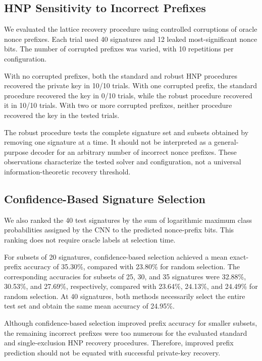 \documentclass[11pt,a4paper]{article}
\begin{document}
\subsection{HNP Sensitivity to Incorrect Prefixes}

We evaluated the lattice recovery procedure using controlled
corruptions of oracle nonce prefixes. Each trial used 40
signatures and 12 leaked most-significant nonce bits. The
number of corrupted prefixes was varied, with 10 repetitions
per configuration.

With no corrupted prefixes, both the standard and robust
HNP procedures recovered the private key in 10/10 trials.
With one corrupted prefix, the standard procedure recovered
the key in 0/10 trials, while the robust procedure recovered
it in 10/10 trials. With two or more corrupted prefixes,
neither procedure recovered the key in the tested trials.

The robust procedure tests the complete signature set and
subsets obtained by removing one signature at a time.
It should not be interpreted as a general-purpose decoder
for an arbitrary number of incorrect nonce prefixes.
These observations characterize the tested solver and
configuration, not a universal information-theoretic
recovery threshold.

\subsection{Confidence-Based Signature Selection}

We also ranked the 40 test signatures by the sum of
logarithmic maximum class probabilities assigned by the CNN
to the predicted nonce-prefix bits. This ranking does not
require oracle labels at selection time.

For subsets of 20 signatures, confidence-based selection
achieved a mean exact-prefix accuracy of 35.30\%, compared
with 23.80\% for random selection. The corresponding
accuracies for subsets of 25, 30, and 35 signatures were
32.88\%, 30.53\%, and 27.69\%, respectively, compared with
23.64\%, 24.13\%, and 24.49\% for random selection.
At 40 signatures, both methods necessarily select the
entire test set and obtain the same mean accuracy of 24.95\%.

Although confidence-based selection improved prefix
accuracy for smaller subsets, the remaining incorrect
prefixes were too numerous for the evaluated standard
and single-exclusion HNP recovery procedures. Therefore,
improved prefix prediction should not be equated with
successful private-key recovery.
\end{document}
